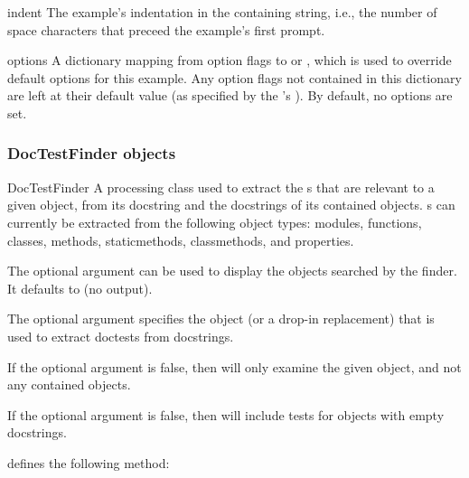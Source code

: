 \begin{memberdesc}{indent}
    The example's indentation in the containing string, i.e., the
    number of space characters that preceed the example's first
    prompt.
\end{memberdesc}

\begin{memberdesc}{options}
    A dictionary mapping from option flags to  or
    , which is used to override default options for this
    example.  Any option flags not contained in this dictionary are
    left at their default value (as specified by the
    's ).
    By default, no options are set.
\end{memberdesc}

\subsubsection{DocTestFinder objects\label{doctest-DocTestFinder}}
\begin{classdesc}{DocTestFinder}{}
    A processing class used to extract the s that are
    relevant to a given object, from its docstring and the docstrings
    of its contained objects.  s can currently be
    extracted from the following object types: modules, functions,
    classes, methods, staticmethods, classmethods, and properties.

    The optional argument  can be used to display the
    objects searched by the finder.  It defaults to  (no
    output).

    The optional argument  specifies the
     object (or a drop-in replacement) that is
    used to extract doctests from docstrings.

    If the optional argument  is false, then
     will only examine the given object,
    and not any contained objects.

    If the optional argument  is false, then
     will include tests for objects with
    empty docstrings.

\end{classdesc}

 defines the following method:

